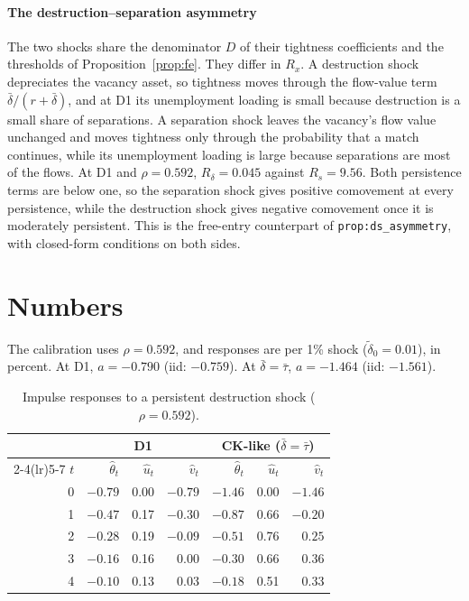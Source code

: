 \documentclass[authoryear, review, 12pt]{elsarticle}
\begin{document}
\paragraph{The destruction--separation asymmetry}
The two shocks share the denominator $D$ of their tightness coefficients and the
thresholds of Proposition~\ref{prop:fe}. They differ in $R_x$. A destruction shock
depreciates the vacancy asset, so tightness moves through the flow-value term
$\bar\delta/(r+\bar\delta)$, and at D1 its unemployment loading is small because destruction
is a small share of separations. A separation shock leaves the vacancy's flow value
unchanged and moves tightness only through the probability that a match continues, while
its unemployment loading is large because separations are most of the flows. At D1 and
$\rho=0.592$, $R_\delta=0.045$ against $R_s=9.56$. Both persistence terms are below one, so
the separation shock gives positive comovement at every persistence, while the destruction
shock gives negative comovement once it is moderately persistent. This is the free-entry
counterpart of \texttt{prop:ds\_asymmetry}, with closed-form conditions on both sides.

\section{Numbers}

The calibration uses $\rho=0.592$, and responses are per 1\% shock ($\tilde\delta_0=0.01$),
in percent. At D1, $a=-0.790$ (iid: $-0.759$). At $\bar\delta=\bar\tau$, $a=-1.464$ (iid:
$-1.561$).

\begin{table}[h]
\centering
\begin{tabular}{rrrrrrr}
\toprule
 & \multicolumn{3}{c}{D1} & \multicolumn{3}{c}{CK-like ($\bar\delta=\bar\tau$)} \\
\cmidrule(lr){2-4}\cmidrule(lr){5-7}
$t$ & $\hat\theta_t$ & $\hat u_t$ & $\hat v_t$ & $\hat\theta_t$ & $\hat u_t$ & $\hat v_t$ \\
\midrule
0 & $-0.79$ & 0.00 & $-0.79$ & $-1.46$ & 0.00 & $-1.46$ \\
1 & $-0.47$ & 0.17 & $-0.30$ & $-0.87$ & 0.66 & $-0.20$ \\
2 & $-0.28$ & 0.19 & $-0.09$ & $-0.51$ & 0.76 & $0.25$ \\
3 & $-0.16$ & 0.16 & $0.00$ & $-0.30$ & 0.66 & $0.36$ \\
4 & $-0.10$ & 0.13 & $0.03$ & $-0.18$ & 0.51 & $0.33$ \\
\bottomrule
\end{tabular}
\caption{Impulse responses to a persistent destruction shock ($\rho=0.592$).}
\label{tab:irf}
\end{table}
\end{document}
